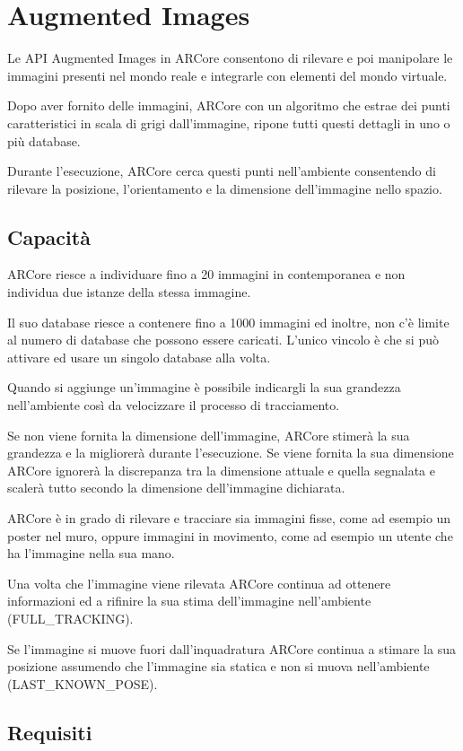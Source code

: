 \documentclass[crop=false, class=book]{standalone}
\begin{document}
	\chapter{Augmented Images}
	
	
	Le API Augmented Images in ARCore consentono di rilevare e poi manipolare le immagini presenti nel mondo reale e integrarle con elementi del mondo virtuale.
	
Dopo aver fornito delle immagini, ARCore con un algoritmo che estrae dei punti caratteristici in scala di grigi dall’immagine, ripone tutti questi dettagli in uno o più database.

Durante l’esecuzione, ARCore cerca questi punti nell’ambiente consentendo di rilevare la posizione, l’orientamento e la dimensione dell’immagine nello spazio.

	\section{Capacità}
	ARCore riesce a individuare fino a 20 immagini in contemporanea e non individua due istanze della stessa immagine.
	
Il suo database riesce a contenere fino a 1000 immagini ed inoltre, non c’è limite al numero di database che possono essere caricati. L’unico vincolo è che si può attivare ed usare un singolo database alla volta.

Quando si aggiunge un’immagine è possibile indicargli la sua grandezza nell’ambiente così da velocizzare il processo di tracciamento.

Se non viene fornita la dimensione dell’immagine, ARCore stimerà la sua grandezza e la migliorerà durante l’esecuzione. Se viene fornita la sua dimensione ARCore ignorerà la discrepanza tra la dimensione attuale e quella segnalata e scalerà tutto secondo la dimensione dell’immagine dichiarata.

ARCore è in grado di rilevare e tracciare sia immagini fisse, come ad esempio un poster nel muro, oppure immagini in movimento, come ad esempio un utente che ha l’immagine nella sua mano.

Una volta che l’immagine viene rilevata ARCore continua ad ottenere informazioni ed a rifinire la sua stima dell’immagine nell’ambiente (FULL\_TRACKING).

Se l’immagine si muove fuori dall’inquadratura ARCore continua a stimare la sua posizione assumendo che l’immagine sia statica e non si muova nell’ambiente (LAST\_KNOWN\_POSE).

	
\section{Requisiti}
\end{document}
